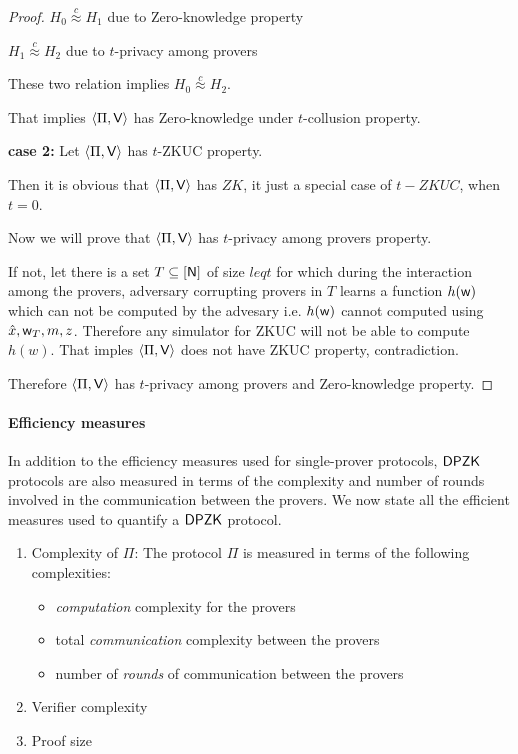 \begin{proof}
	$H_0 \stackrel{c}{\approx} H_1$ due to Zero-knowledge property
	
	$H_1 \stackrel{c}{\approx} H_2$ due to $t$-privacy among provers
	
	These two relation implies $H_0 \stackrel{c}{\approx} H_2$.
	
	That implies $\langle \Pi,\mathsf{V}\rangle$ has Zero-knowledge under $t$-collusion property.
	
	\textbf{case 2:} Let $\langle \Pi,\mathsf{V}\rangle$ has $t$-ZKUC property.
	
	Then it is obvious that $\langle \Pi,\mathsf{V}\rangle$ has $ZK$, it just a special case of $t-ZKUC$, when $t=0$.
	
	Now we will prove that $\langle \Pi,\mathsf{V}\rangle$ has $t$-privacy among provers property. 
	
	If not, let there is a set $T\subseteq [\mathsf{N}]$ of size $leq t$ for which during the interaction among the provers, adversary corrupting provers in $T$ learns a function $h(\mathsf{w})$ which can not be computed by the advesary i.e. $h(\mathsf{w})$ cannot computed using $\hat{x}, \mathsf{w}_T, m, z$. Therefore any simulator for ZKUC will not be able to compute $h(w)$. That imples $\langle \Pi,\mathsf{V}\rangle$ does not have ZKUC property, contradiction.
	
	Therefore $\langle \Pi,\mathsf{V}\rangle$ has $t$-privacy among provers and Zero-knowledge property.
\end{proof}


\paragraph{Efficiency measures}
In addition to the efficiency measures used for single-prover protocols, $\mathsf{DPZK}$ protocols are also measured in terms of the complexity and number of rounds involved in the communication between the provers. We now state all the efficient measures used to quantify a $\mathsf{DPZK}$ protocol.
\begin{enumerate}
\item Complexity of $\Pi$: The protocol $\Pi$ is measured in terms of the following complexities:
\begin{itemize}
\item \textit{computation} complexity for the provers
\item total \textit{communication} complexity between the provers
\item number of \textit{rounds} of communication between the provers
\end{itemize}
\item Verifier complexity
\item Proof size
\end{enumerate}

